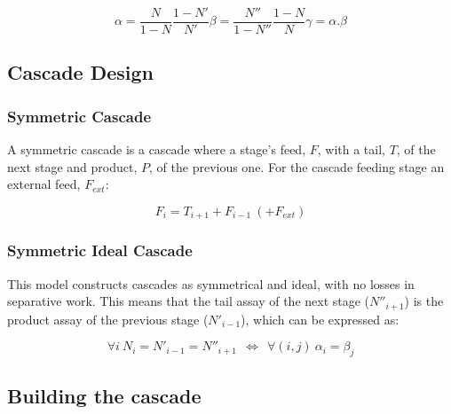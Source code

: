 \begin{subequations}
    \label{eq_alphabeta}
    \begin{equation} \label{eq_alpha_def}
        \alpha = \frac{N}{1-N}\frac{1-N'}{N'}
    \end{equation}
    \begin{equation}\label{eq_beta-def}
        \beta = \frac{N''}{1-N''}\frac{1-N}{N}
    \end{equation}
    \begin{equation}\label{eq_gamma-def}
        \gamma = \alpha.\beta
    \end{equation}
\end{subequations}


\subsection{Cascade Design}
\subsubsection{Symmetric Cascade}

A symmetric cascade is a cascade where a stage's feed, $F$, with a tail, $T$, of the next
stage and product, $P$, of the previous one. For the cascade feeding stage
an external feed, $F_{ext}$:

\begin{equation}
    F_{i} = T_{i+1} + F_{i-1} ~(+ F_{ext})
\end{equation}

\subsubsection{Symmetric Ideal Cascade}
This model constructs cascades as symmetrical and ideal, with no losses in
separative work. This means that the tail assay of the next stage ($N''_{i+1}$)
is the product assay of the previous stage ($N'_{i-1}$), which can be
expressed as:

\begin{equation}
    \forall i~ N_{i} = N'_{i-1} = N''_{i+1}~ ~\Leftrightarrow~ ~\forall (i,j)~
    \alpha_{i} = \beta_{j}
\end{equation}



\subsection{Building the cascade}

